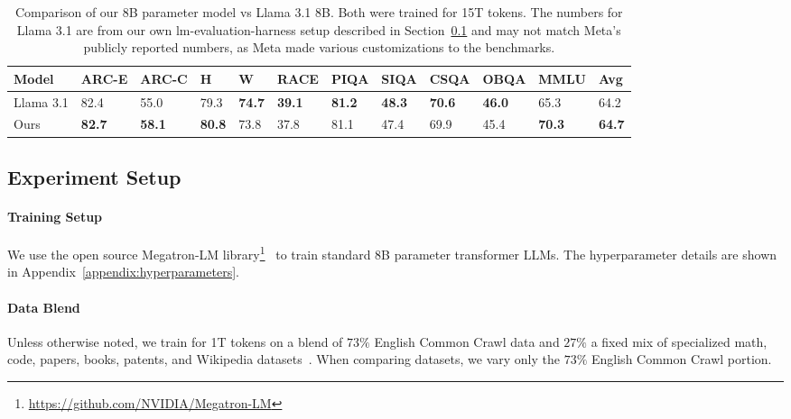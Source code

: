 \documentclass[11pt]{article}
\begin{document}
\begin{table}[!hbt]\small\centering
\begin{tabularx}{\textwidth}{Xlllllllllll}
\toprule
\textbf{Model}        & \textbf{ARC-E} & \textbf{ARC-C} & \textbf{H}    & \textbf{W}    & \textbf{RACE} & \textbf{PIQA} & \textbf{SIQA} & \textbf{CSQA} & \textbf{OBQA} & \textbf{MMLU} & \textbf{Avg}       \\ \midrule
Llama 3.1 & 82.4          & 55.0          & 79.3          & \textbf{74.7} & \textbf{39.1} & \textbf{81.2} & \textbf{48.3} & \textbf{70.6} & \textbf{46.0} & 65.3          & 64.2          \\
Ours       & \textbf{82.7} & \textbf{58.1} & \textbf{80.8} & 73.8          & 37.8          & 81.1          & 47.4          & 69.9          & 45.4          & \textbf{70.3} & \textbf{64.7} \\ \bottomrule
\end{tabularx}
\caption{Comparison of our 8B parameter model vs Llama 3.1 8B. Both were trained for 15T tokens. The numbers for Llama 3.1 are from our own lm-evaluation-harness setup described in Section~\ref{section:experiment-setup} and may not match Meta's publicly reported numbers, as Meta made various customizations to the benchmarks.}
\label{table:8b-15t}
\end{table}


\subsection{Experiment Setup}
\label{section:experiment-setup}

\paragraph{Training Setup} We use the open source Megatron-LM library\footnote{\url{https://github.com/NVIDIA/Megatron-LM}}~\citep{shoeybi2019megatron} to train standard 8B parameter transformer LLMs. The hyperparameter details are shown in Appendix~\ref{appendix:hyperparameters}.

\paragraph{Data Blend} Unless otherwise noted, we train for 1T tokens on a blend of $73\%$ English Common Crawl data and $27\%$ a fixed mix of specialized math, code, papers, books, patents, and Wikipedia datasets~\citep{adler2024nemotron}. When comparing datasets, we vary only the $73\%$ English Common Crawl portion.
\end{document}
